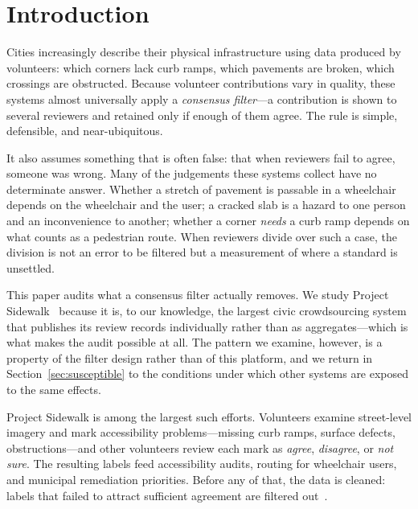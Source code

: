 \documentclass[sigconf]{acmart}
\begin{document}

\maketitle

\section{Introduction}

Cities increasingly describe their physical infrastructure using data produced
by volunteers: which corners lack curb ramps, which pavements are broken, which
crossings are obstructed. Because volunteer contributions vary in quality, these
systems almost universally apply a \emph{consensus filter}---a contribution is
shown to several reviewers and retained only if enough of them agree. The rule
is simple, defensible, and near-ubiquitous.

It also assumes something that is often false: that when reviewers fail to
agree, someone was wrong. Many of the judgements these systems collect have no
determinate answer. Whether a stretch of pavement is passable in a wheelchair
depends on the wheelchair and the user; a cracked slab is a hazard to one person
and an inconvenience to another; whether a corner \emph{needs} a curb ramp
depends on what counts as a pedestrian route. When reviewers divide over such a
case, the division is not an error to be filtered but a measurement of where a
standard is unsettled.

This paper audits what a consensus filter actually removes. We study Project
Sidewalk~\cite{saha2019projectsidewalk} because it is, to our knowledge, the
largest civic crowdsourcing system that publishes its review records
individually rather than as aggregates---which is what makes the audit possible
at all. The pattern we examine, however, is a property of the filter design
rather than of this platform, and we return in Section~\ref{sec:susceptible} to
the conditions under which other systems are exposed to the same effects.

Project Sidewalk is among the largest such efforts. Volunteers examine street-level imagery and mark accessibility
problems---missing curb ramps, surface defects, obstructions---and other
volunteers review each mark as \emph{agree}, \emph{disagree}, or
\emph{not sure}. The resulting labels feed accessibility audits, routing for
wheelchair users, and municipal remediation priorities. Before any of that, the
data is cleaned: labels that failed to attract sufficient agreement are filtered
out~\cite{li2024labelaid}.
\end{document}

